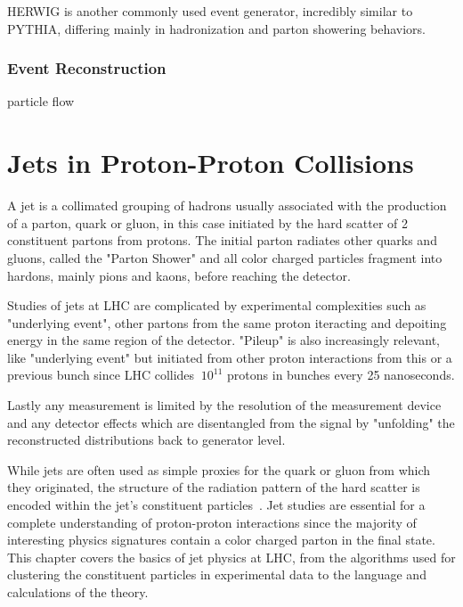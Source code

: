 HERWIG is another commonly used event generator, incredibly similar to PYTHIA, differing mainly in hadronization and parton showering behaviors.


\subsection{Event Reconstruction}\label{secReco}


particle flow











\chapter{Jets in Proton-Proton Collisions}%

A jet is a collimated grouping of hadrons usually associated with the production of a parton, quark or gluon, in this case initiated by the hard scatter of 2 constituent partons from protons. The initial parton radiates other quarks and gluons, called the "Parton Shower" and all color charged particles fragment into hardons, mainly pions and kaons,  before reaching the detector.

Studies of jets at LHC are complicated by experimental complexities such as "underlying event", other partons from the same proton iteracting and depoiting energy in the same region of the detector. "Pileup" is also increasingly relevant, like "underlying event" but initiated from other proton interactions from this or a previous bunch since LHC collides $~10^{11}$ protons in bunches every 25 nanoseconds.



Lastly any measurement is limited by the resolution of the measurement device and any detector effects which are disentangled from the signal by "unfolding" the reconstructed distributions back to generator level.

While jets are often used as simple proxies for the quark or gluon from which they originated, the structure of the radiation pattern of the hard scatter is encoded within the jet's constituent particles~\cite{Asquith:2018igt}. Jet studies are essential for a complete understanding of proton-proton interactions since the majority of interesting physics signatures contain a color charged parton in the final state. This chapter covers the basics of jet physics at LHC, from the algorithms used for clustering the constituent particles in experimental data to the language and calculations of the theory.

